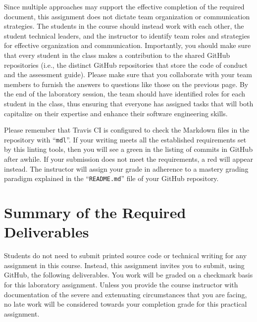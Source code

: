\documentclass[11pt]{article}
\newcommand{\command}[1]{``\lstinline{#1}''}
\newcommand{\checkmark}{\ding{51}}
\newcommand{\naughtmark}{\ding{55}}
\begin{document}
Since multiple approaches may support the effective completion of the required
document, this assignment does not dictate team organization or communication
strategies. The students in the course should instead work with each other, the
student technical leaders, and the instructor to identify team roles and
strategies for effective organization and communication. Importantly, you should
make sure that every student in the class makes a contribution to the shared
GitHub repositories (i.e., the distinct GitHub repositories that store the code
of conduct and the assessment guide).
%
Please make sure that you collaborate with your team members to furnish the
answers to questions like those on the previous page.
%
By the end of the laboratory session, the team should have identified roles for
each student in the class, thus ensuring that everyone has assigned tasks that
will both capitalize on their expertise and enhance their software engineering
skills.

Please remember that Travis CI is configured to check the Markdown files in the
repository with \command{mdl}.
%
If your writing meets all the established requirements set by this linting
tools, then you will see a green \checkmark{} in the listing of commits in
GitHub after awhile. If your submission does not meet the requirements, a red
\naughtmark{} will appear instead. The instructor will assign your grade in
adherence to a mastery grading paradigm explained in the \command{README.md}
file of your GitHub repository.



\section*{Summary of the Required Deliverables}

\noindent Students do not need to submit printed source code or technical
writing for any assignment in this course. Instead, this assignment invites you
to submit, using GitHub, the following deliverables. You work will be graded on
a checkmark basis for this laboratory assignment.
%
Unless you provide the course instructor with documentation of the severe and
extenuating circumstances that you are facing, no late work will be considered
towards your completion grade for this practical assignment.
\end{document}
